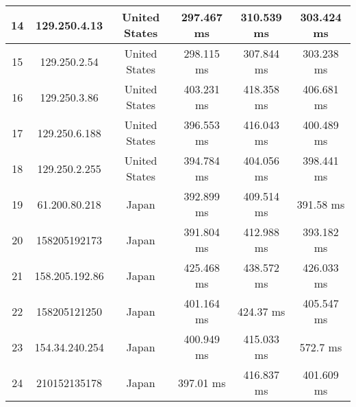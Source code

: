 \begin{table}[]
\begin{tabular}{ | c | c | c | c | c | c | }
14	&129.250.4.13    &    	   United States &   	     297.467 ms    & 	     310.539 ms     &	     303.424 ms  \\ \hline    
15	&129.250.2.54    &    	   United States &   	     298.115 ms    & 	     307.844 ms     &	     303.238 ms  \\ \hline    
16	&129.250.3.86    &    	   United States &   	     403.231 ms    & 	     418.358 ms     &	     406.681 ms  \\ \hline    
17	&129.250.6.188   &    	   United States &   	     396.553 ms    & 	     416.043 ms     &	     400.489 ms  \\ \hline    
18	&129.250.2.255   &    	   United States &   	     394.784 ms    & 	     404.056 ms     &	     398.441 ms  \\ \hline    
19	&61.200.80.218   &    	       Japan     &   	     392.899 ms    & 	     409.514 ms     &	      391.58 ms  \\ \hline    
20	&158205192173	 &      Japan        	  &   391.804 ms     	    & 412.988 ms     	     &393.182 ms     \\ \hline    
21	&158.205.192.86  &    	       Japan     &   	     425.468 ms    & 	     438.572 ms     &	     426.033 ms  \\ \hline     
22	&158205121250	 &      Japan        	  &   401.164 ms     	    &  424.37 ms     	     &405.547 ms     \\ \hline    
23	&154.34.240.254  &    	       Japan     &   	     400.949 ms    & 	     415.033 ms     &	       572.7 ms  \\ \hline    
24	&210152135178	 &      Japan        	  &    397.01 ms     	    & 416.837 ms     	     &401.609 ms         \\ \hline

\end{tabular}
\end{table}
% 